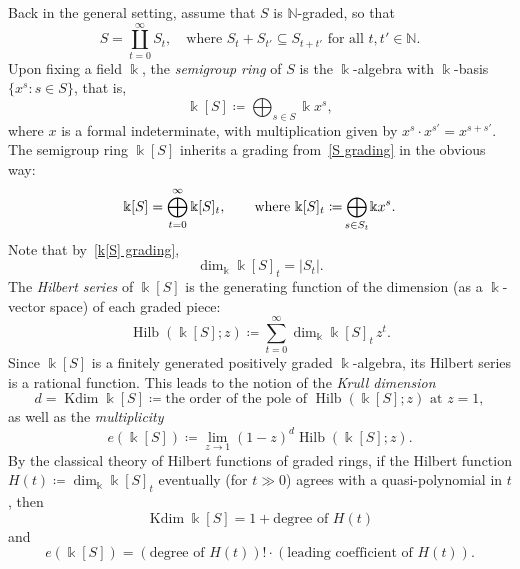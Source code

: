 \documentclass[noamsfonts,10pt]{amsart}
\newcommand{\N}{\mathbb{N}}
\renewcommand{\k}{\Bbbk}
\DeclareMathOperator{\Hilb}{Hilb}
\DeclareMathOperator{\Kdim}{Kdim}
\newcommand{\1}{\mathbf{1}}
\theoremstyle{plain}
\theoremstyle{definition}
\numberwithin{equation}{section}
\begin{document}
Back in the general setting, assume that $S$ is $\N$-graded, so that
\begin{equation}
    \label{S grading}
    S = \coprod_{t=0}^\infty S_t, \quad \text{where $S_t + S_{t'} \subseteq S_{t+t'}$ for all $t,t' \in \N$}.
\end{equation}
Upon fixing a field $\k$, the \emph{semigroup ring} of $S$ is the $\k$-algebra with $\k$-basis $\{x^s : s \in S \}$, that is,
\begin{equation}
    \label{k[S]}
    \k[S] \coloneqq \bigoplus_{s \in S} \k x^s,
\end{equation}
where $x$ is a formal indeterminate, with multiplication given by $x^s \cdot x^{s'} = x^{s+s'}$.
The semigroup ring $\k[S]$ inherits a grading from~\eqref{S grading} in the obvious way:
\begin{equation}
    \label{k[S] grading}
    \k[S] = \bigoplus_{t=0}^\infty \k[S]_t, \qquad \text{where } \k[S]_t \coloneqq \bigoplus_{\mathclap{s \in S_t}} \k x^s.
\end{equation}
Note that by~\eqref{k[S] grading},
\begin{equation}
    \label{dim k[S] is size St}
    \dim_\k \k[S]_t = \left| S_t \right|.
\end{equation}
The \emph{Hilbert series} of $\k[S]$ is the generating function of the dimension (as a $\k$-vector space) of each graded piece:
\begin{equation}
    \label{Hilb k[S]}
    \Hilb(\k[S]; z) \coloneqq \sum_{t=0}^\infty \dim_{\k} \k[S]_t \, z^t. 
\end{equation}
Since $\k[S]$ is a finitely generated positively graded $\k$-algebra, its Hilbert series is a rational function.
This leads to the notion of the \emph{Krull dimension}
\begin{equation}
    \label{Kdim k[S]}
    d = \Kdim \k[S] \coloneqq \text{the order of the pole of $\Hilb(\k[S]; z)$ at $z=1$},
\end{equation}
as well as the \emph{multiplicity}
\begin{equation}
    \label{e(k[S])}
    e(\k[S]) \coloneqq \lim_{z \rightarrow 1} (1-z)^{d} \Hilb(\k[S];z).
\end{equation}
By the classical theory of Hilbert functions of graded rings, if the Hilbert function $H(t) \coloneqq \dim_{\k} \k[S]_t$ eventually (for $t \gg 0$) agrees with a quasi-polynomial in $t$, then
\begin{equation}
    \label{Kdim and H(t)}
    \Kdim \k[S] = 1 + \text{degree of $H(t)$}
\end{equation}
and
\begin{equation}
    \label{e and H(t)}
    e( \k[S] ) = ( \text{degree of $H(t)$} )! \cdot ( \text{leading coefficient of $H(t)$} ).
\end{equation}
\end{document}

